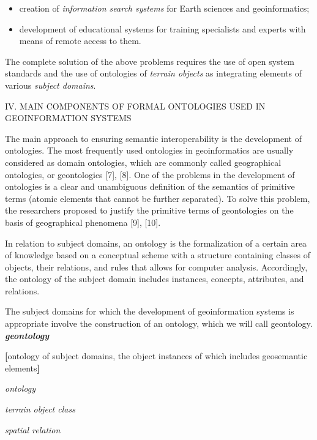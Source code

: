 \documentclass{article}
\date{}
\begin{document}
\begin{multicols}{2}
    \begin{itemize}
        \item creation of \textit{information search systems} for Earth sciences and geoinformatics;
        \item development of educational systems for training specialists and experts with means of remote access to them.
    \end{itemize}

    The complete solution of the above problems requires the use of open system standards and the use of ontologies of \textit{terrain objects} as integrating elements of various \textit{subject domains}.

    \begin{center}
        IV. MAIN COMPONENTS OF FORMAL ONTOLOGIES USED IN GEOINFORMATION SYSTEMS
    \end{center}

    The main approach to ensuring semantic interoperability is the development of ontologies. The most frequently used ontologies in geoinformatics are usually considered as domain ontologies, which are commonly called geographical ontologies, or geontologies [7], [8]. One of the problems in the development of ontologies is a clear and unambiguous definition of the semantics of primitive terms (atomic elements that cannot be further separated). To solve this problem, the researchers proposed to justify the primitive terms of geontologies on the basis of geographical phenomena [9], [10]. \par In relation to subject domains, an ontology is the formalization of a certain area of knowledge based on a conceptual scheme with a structure containing classes of objects, their relations, and rules that allows for computer analysis. Accordingly, the ontology of the subject domain includes instances, concepts, attributes, and relations. \par The subject domains for which the development of geoinformation systems is appropriate involve the construction of an ontology, which we will call geontology. \\

    \noindent \textit{\textbf{geontology}}
    \vspace{-0.3cm}
    \begin{description}[leftmargin=!, labelwidth=1cm, itemsep=-1.5mm]
        \item[$\coloneqq$] \textbf{[}ontology of subject domains, the object instances of which includes geosemantic elements\textbf{]}
        \item[$\coloneqq$] [ontology of subject domains, object instances of which use spatially correlated data about the territory, social and natural phenomena\textbf{]}
        \item[$\subseteq$] \textit{ontology}
        \item[$\ni$] \textit{terrain object class}
        \item[$\ni$] \textit{spatial relation}
    \end{description}


\end{multicols}
\end{document}
